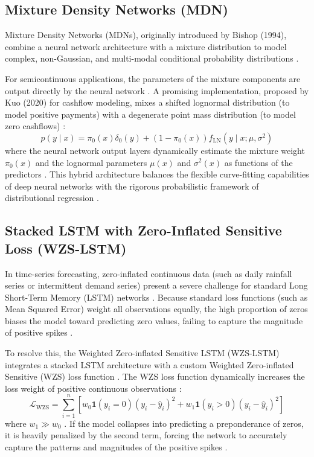 \subsection{Mixture Density Networks (MDN)}

Mixture Density Networks (MDNs), originally introduced by Bishop (1994), combine a neural network architecture with a mixture distribution to model complex, non-Gaussian, and multi-modal conditional probability distributions \cite{bishop1994}. 

For semicontinuous applications, the parameters of the mixture components are output directly by the neural network \cite{bishop1994}. A promising implementation, proposed by Kuo (2020) for cashflow modeling, mixes a shifted lognormal distribution (to model positive payments) with a degenerate point mass distribution (to model zero cashflows) \cite{bishop1994}:
\[
p(y \mid x) = \pi_0(x)\delta_0(y) + (1-\pi_0(x))f_{\text{LN}}(y \mid x; \mu, \sigma^2)
\]
where the neural network output layers dynamically estimate the mixture weight $\pi_0(x)$ and the lognormal parameters $\mu(x)$ and $\sigma^2(x)$ as functions of the predictors \cite{bishop1994}. This hybrid architecture balances the flexible curve-fitting capabilities of deep neural networks with the rigorous probabilistic framework of distributional regression \cite{bishop1994}.

\subsection{Stacked LSTM with Zero-Inflated Sensitive Loss (WZS-LSTM)}

In time-series forecasting, zero-inflated continuous data (such as daily rainfall series or intermittent demand series) present a severe challenge for standard Long Short-Term Memory (LSTM) networks \cite{wzslstm2024}. Because standard loss functions (such as Mean Squared Error) weight all observations equally, the high proportion of zeros biases the model toward predicting zero values, failing to capture the magnitude of positive spikes \cite{wzslstm2024}.

To resolve this, the Weighted Zero-inflated Sensitive LSTM (WZS-LSTM) integrates a stacked LSTM architecture with a custom Weighted Zero-inflated Sensitive (WZS) loss function \cite{wzslstm2024}. The WZS loss function dynamically increases the loss weight of positive continuous observations \cite{wzslstm2024}:
\[
\mathcal{L}_{\text{WZS}} = \sum_{i=1}^n \left[ w_0 \mathbf{1}(y_i = 0)(y_i - \hat{y}_i)^2 + w_1 \mathbf{1}(y_i > 0)(y_i - \hat{y}_i)^2 \right]
\]
where $w_1 \gg w_0$ \cite{wzslstm2024}. If the model collapses into predicting a preponderance of zeros, it is heavily penalized by the second term, forcing the network to accurately capture the patterns and magnitudes of the positive spikes \cite{wzslstm2024}.

